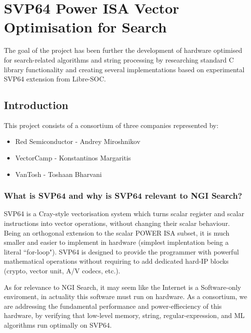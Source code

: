 \chapter{SVP64 Power ISA Vector Optimisation for Search}

The goal of the project has been further the development of hardware
optimised for search-related algorithms and string processing by
researching standard C library functionality and creating several
implementations based on experimental \acrshort{SVP64} extension from Libre-SOC.

\section{Introduction}

This project consists of a consortium of three companies represented by:

\begin{itemize}
  \item Red Semiconductor - Andrey Miroshnikov
  \item VectorCamp - Konstantinos Margaritis
  \item VanTosh - Toshaan Bharvani
\end{itemize}

\subsection{What is \acrshort{SVP64} and why is \acrshort{SVP64} relevant to \acrshort{NGI} Search?}

\acrfull{SVP64} is a Cray-style vectorisation system which
turns scalar register and scalar instructions into vector operations,
without changing their scalar behaviour. Being an orthogonal extension to the
scalar \acrfull{POWER} ISA subset, it is much smaller and easier to implement in
hardware (simplest implentation being a literal ``for-loop"). \acrshort{SVP64} is
designed to provide the programmer with powerful mathematical operations
without requiring to add dedicated hard-IP blocks (crypto, vector unit, A/V
codecs, etc.).

As for relevance to \acrfull{NGI} Search, it may seem like the Internet is a
Software-only enviroment, in actuality this software must run on hardware.
As a consortium, we are addressing the fundamental performance and
power-effieciency of this hardware, by verifying that low-level memory,
string, regular-expression, and \acrfull{ML} algorithms run optimally
on \acrshort{SVP64}.

